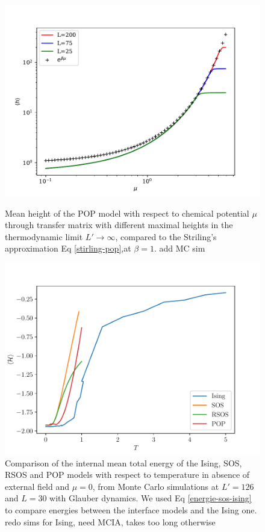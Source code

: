 \begin{figure}[!htb]
\centering
\includegraphics{pop/hauteur-tm-pop.pdf}
\caption{Mean height of the POP model with respect to chemical potential $\mu$ through transfer matrix with different maximal heights in the thermodynamic limit $L'\to \infty$, compared to the Striling's approximation Eq \eqref{stirling-pop},at $\beta=1$. {\color{red} add MC sim}}
\label{haut-tm-pop} 
\includegraphics{pop/comparaison-modeles.pdf}
\caption{Comparison of the internal mean total energy of the Ising, SOS, RSOS and POP models with respect to temperature in absence of external field and $\mu=0$, from Monte Carlo simulations at $L'=126$ and $L=30$ with Glauber dynamics. We used Eq \ref{energie-sos-ising} to compare energies between the interface models and the Ising one.
{\color{red} redo sims for Ising, need MCIA, takes too long otherwise}}
\label{comp-models}
\end{figure}

